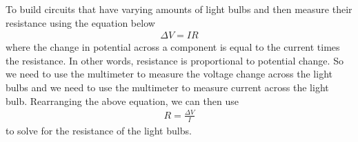 \documentclass{article}
\begin{document}
    To build circuits that have varying amounts of light bulbs and then measure their resistance using the equation below
    \begin{align*}
        \Delta V = IR
    \end{align*}
    where the change in potential across a component is equal to the current times the resistance. In other words, resistance is proportional to potential change. So we need to use the multimeter to measure the voltage change across the light bulbs and we need to use the multimeter to measure current across the light bulb. Rearranging the above equation, we can then use 
    \begin{align*}
        R = \frac{\Delta V}{I}
    \end{align*}
    to solve for the resistance of the light bulbs.
\end{document}
